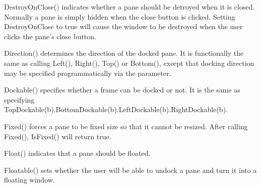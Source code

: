 DestroyOnClose() indicates whether a pane should be detroyed when it is closed.  Normally a pane is simply hidden when the close button is clicked.  Setting DestroyOnClose to true will cause the window to be destroyed when the user clicks the pane's close button.

\label{wxauipaneinfodirection}


Direction() determines the direction of the docked pane.  It is functionally the same as calling Left(), Right(), Top() or Bottom(), except that docking direction may be specified programmatically via the parameter.

\label{wxauipaneinfodock}



\label{wxauipaneinfodockable}


Dockable() specifies whether a frame can be docked or not.  It is the same as specifying TopDockable(b).BottomDockable(b).LeftDockable(b).RightDockable(b).

\label{wxauipaneinfofixed}


Fixed() forces a pane to be fixed size so that it cannot be resized.  After calling Fixed(), IsFixed() will return true.

\label{wxauipaneinfofloat}


Float() indicates that a pane should be floated.

\label{wxauipaneinfofloatable}


Floatable() sets whether the user will be able to undock a pane and turn it into a floating window.

\label{wxauipaneinfofloatingposition}



